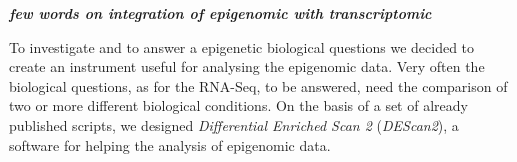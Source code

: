 
\textbf{\textsl{few words on integration of epigenomic with transcriptomic}}

To investigate and to answer a epigenetic biological questions we decided to create an instrument useful for analysing the epigenomic data.
Very often the biological questions, as for the RNA-Seq, to be answered, need the comparison of two or more different biological conditions.
On the basis of a set of already published \cite{Koberstein2018} scripts, we designed \textit{Differential Enriched Scan 2} (\textit{DEScan2}), a software for helping the analysis of epigenomic data.